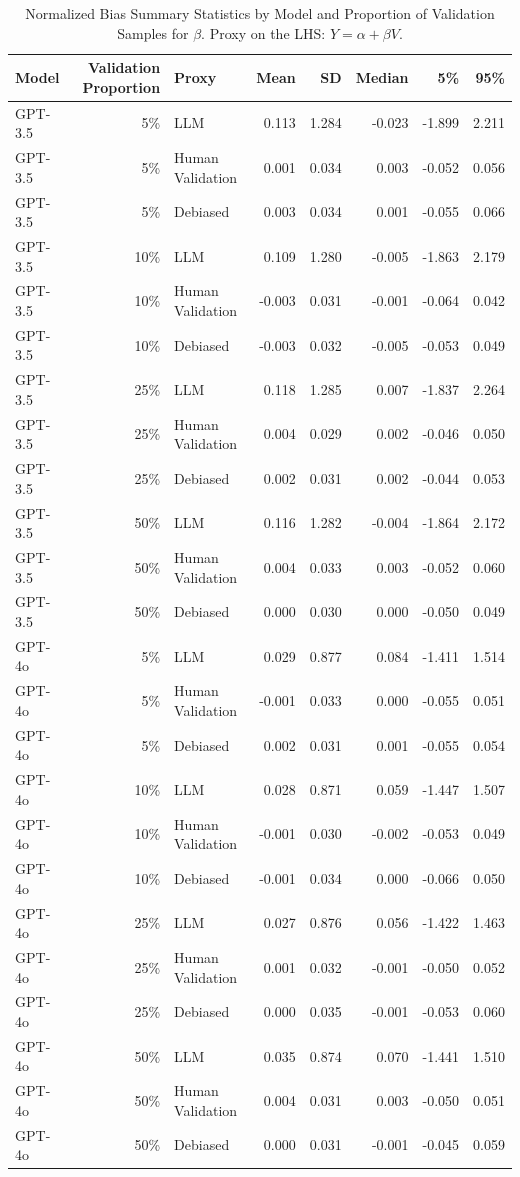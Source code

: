 \begin{table}

\caption{\label{tab:unnamed-chunk-2}Normalized Bias Summary Statistics by Model and Proportion of Validation Samples for $\beta$. Proxy on the LHS: $Y = \alpha + \beta V$.}
\centering
\begin{tabular}[t]{lrlrrrrr}
\toprule
Model & Validation Proportion & Proxy & Mean & SD & Median & 5\% & 95\%\\
\midrule
GPT-3.5 & 5\% & LLM & 0.113 & 1.284 & -0.023 & -1.899 & 2.211\\
GPT-3.5 & 5\% & Human Validation & 0.001 & 0.034 & 0.003 & -0.052 & 0.056\\
GPT-3.5 & 5\% & Debiased & 0.003 & 0.034 & 0.001 & -0.055 & 0.066\\
GPT-3.5 & 10\% & LLM & 0.109 & 1.280 & -0.005 & -1.863 & 2.179\\
GPT-3.5 & 10\% & Human Validation & -0.003 & 0.031 & -0.001 & -0.064 & 0.042\\
GPT-3.5 & 10\% & Debiased & -0.003 & 0.032 & -0.005 & -0.053 & 0.049\\
GPT-3.5 & 25\% & LLM & 0.118 & 1.285 & 0.007 & -1.837 & 2.264\\
GPT-3.5 & 25\% & Human Validation & 0.004 & 0.029 & 0.002 & -0.046 & 0.050\\
GPT-3.5 & 25\% & Debiased & 0.002 & 0.031 & 0.002 & -0.044 & 0.053\\
GPT-3.5 & 50\% & LLM & 0.116 & 1.282 & -0.004 & -1.864 & 2.172\\
GPT-3.5 & 50\% & Human Validation & 0.004 & 0.033 & 0.003 & -0.052 & 0.060\\
GPT-3.5 & 50\% & Debiased & 0.000 & 0.030 & 0.000 & -0.050 & 0.049\\
GPT-4o & 5\% & LLM & 0.029 & 0.877 & 0.084 & -1.411 & 1.514\\
GPT-4o & 5\% & Human Validation & -0.001 & 0.033 & 0.000 & -0.055 & 0.051\\
GPT-4o & 5\% & Debiased & 0.002 & 0.031 & 0.001 & -0.055 & 0.054\\
GPT-4o & 10\% & LLM & 0.028 & 0.871 & 0.059 & -1.447 & 1.507\\
GPT-4o & 10\% & Human Validation & -0.001 & 0.030 & -0.002 & -0.053 & 0.049\\
GPT-4o & 10\% & Debiased & -0.001 & 0.034 & 0.000 & -0.066 & 0.050\\
GPT-4o & 25\% & LLM & 0.027 & 0.876 & 0.056 & -1.422 & 1.463\\
GPT-4o & 25\% & Human Validation & 0.001 & 0.032 & -0.001 & -0.050 & 0.052\\
GPT-4o & 25\% & Debiased & 0.000 & 0.035 & -0.001 & -0.053 & 0.060\\
GPT-4o & 50\% & LLM & 0.035 & 0.874 & 0.070 & -1.441 & 1.510\\
GPT-4o & 50\% & Human Validation & 0.004 & 0.031 & 0.003 & -0.050 & 0.051\\
GPT-4o & 50\% & Debiased & 0.000 & 0.031 & -0.001 & -0.045 & 0.059\\
\bottomrule
\end{tabular}
\end{table}
